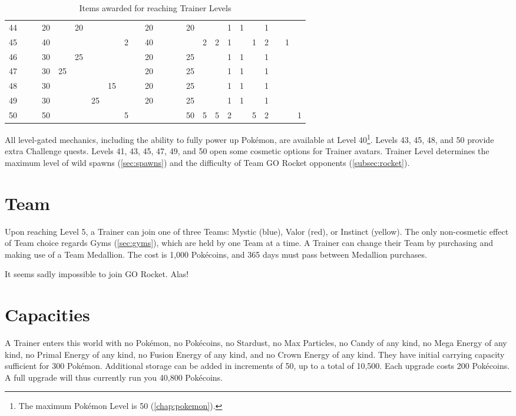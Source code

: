 \begin{table}
\begin{tabular}{r|g c g c g c g c g c g c g c g c g c g c g c g}
  44 &    &    & 20 &    & 20 &    &    &   &    & 20 &    &    &    & 20 &   &   & 1  & 1 &   & 1 &   &   &   \\
  45 &    &    & 40 &    &    &    &    & 2 &    & 40 &    &    &    &    & 2 & 2 & 1  &   & 1 & 2 &   & 1 &   \\
  46 &    &    & 30 &    & 25 &    &    &   &    & 20 &    &    &    & 25 &   &   & 1  & 1 &   & 1 &   &   &   \\
  47 &    &    & 30 & 25 &    &    &    &   &    & 20 &    &    &    & 25 &   &   & 1  & 1 &   & 1 &   &   &   \\
  48 &    &    & 30 &    &    &    & 15 &   &    & 20 &    &    &    & 25 &   &   & 1  & 1 &   & 1 &   &   &   \\
  49 &    &    & 30 &    &    & 25 &    &   &    & 20 &    &    &    & 25 &   &   & 1  & 1 &   & 1 &   &   &   \\
  50 &    &    & 50 &    &    &    &    & 5 &    &    &    &    &    & 50 & 5 & 5 & 2  &   & 5 & 2 &   &   & 1 \\
\end{tabular}
\caption{Items awarded for reaching Trainer Levels}
\label{table:levelitems}
\end{table}
All level-gated mechanics, including the ability to fully power up Pokémon,
 are available at Level 40\footnote{The maximum Pokémon Level is 50 (\autoref{chap:pokemon}).}.
Levels 43, 45, 48, and 50 provide extra Challenge quests.
Levels 41, 43, 45, 47, 49, and 50 open some cosmetic options for Trainer avatars.
Trainer Level determines the maximum level of wild spawns
  (\autoref{sec:spawns}) and the difficulty of Team GO Rocket
  opponents (\autoref{subsec:rocket}).

\section{Team}
Upon reaching Level 5, a Trainer can join one of three Teams: Mystic (blue),
  Valor (red), or Instinct (yellow).
The only non-cosmetic effect of Team choice regards Gyms (\autoref{sec:gyms}), which
  are held by one Team at a time.
A Trainer can change their Team by purchasing and making use of a Team Medallion.
The cost is 1,000 Pokécoins, and 365 days must pass between Medallion purchases.

It seems sadly impossible to join GO Rocket. Alas!

\section{Capacities}
\label{sec:capacities}
A Trainer enters this world with no Pokémon, no Pokécoins, no Stardust,
  no Max Particles, no Candy of any kind, no Mega Energy of any kind,
  no Primal Energy of any kind, no Fusion Energy of any kind, and no Crown
  Energy of any kind.
They have initial carrying capacity sufficient for 300 Pokémon.
Additional storage can be added in increments of 50, up to a total of 10,500.
Each upgrade costs 200 Pokécoins.
A full upgrade will thus currently run you 40,800 Pokécoins.

